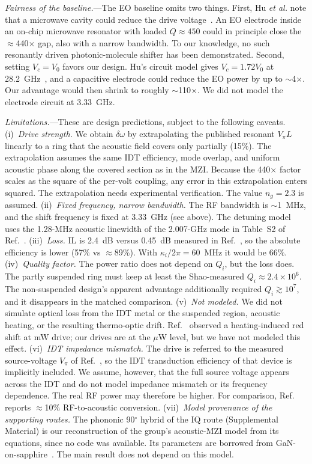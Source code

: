 \documentclass[aps,prl,reprint,superscriptaddress,amsmath,amssymb,floatfix]{revtex4-2}
\begin{document}
\emph{Fairness of the baseline.}---The EO baseline omits two things. First, Hu \emph{et al.} note that a microwave cavity could reduce the drive voltage~\cite{Hu2021}. An EO electrode inside an on-chip microwave resonator with loaded $Q\approx450$ could in principle close the $\approx$440$\times$ gap, also with a narrow bandwidth. To our knowledge, no such resonantly driven photonic-molecule shifter has been demonstrated. Second, setting $V_c=V_0$ favors our design. Hu's circuit model gives $V_c=1.72V_0$ at 28.2~GHz~\cite{Hu2021}, and a capacitive electrode could reduce the EO power by up to $\sim$4$\times$. Our advantage would then shrink to roughly $\sim$110$\times$. We did not model the electrode circuit at 3.33~GHz.

\emph{Limitations.}---These are design predictions, subject to the following caveats.
(i)~\emph{Drive strength.} We obtain $\delta\omega$ by extrapolating the published resonant $V_\pi L$~\cite{Shao2019} linearly to a ring that the acoustic field covers only partially (15\%). The extrapolation assumes the same IDT efficiency, mode overlap, and uniform acoustic phase along the covered section as in the MZI. Because the 440$\times$ factor scales as the square of the per-volt coupling, any error in this extrapolation enters squared. The extrapolation needs experimental verification. The value $n_g=2.3$ is assumed.
(ii)~\emph{Fixed frequency, narrow bandwidth.} The RF bandwidth is $\sim$1~MHz, and the shift frequency is fixed at 3.33~GHz (see above). The detuning model uses the 1.28-MHz acoustic linewidth of the 2.007-GHz mode in Table~S2 of Ref.~\cite{Shao2019}.
(iii)~\emph{Loss.} IL is 2.4~dB versus 0.45~dB measured in Ref.~\cite{Hu2021}, so the absolute efficiency is lower (57\% vs $\approx$89\%). With $\kappa_i/2\pi=60$~MHz it would be 66\%.
(iv)~\emph{Quality factor.} The power ratio does not depend on $Q_i$, but the loss does. The partly suspended ring must keep at least the Shao-measured $Q_i\approx2.4\times10^6$. The non-suspended design's apparent advantage additionally required $Q_i\gtrsim10^7$, and it disappears in the matched comparison.
(v)~\emph{Not modeled.} We did not simulate optical loss from the IDT metal or the suspended region, acoustic heating, or the resulting thermo-optic drift. Ref.~\cite{Shao2019} observed a heating-induced red shift at mW drive; our drives are at the $\mu$W level, but we have not modeled this effect.
(vi)~\emph{IDT impedance mismatch.} The drive is referred to the measured source-voltage $V_\pi$ of Ref.~\cite{Shao2019}, so the IDT transduction efficiency of that device is implicitly included. We assume, however, that the full source voltage appears across the IDT and do not model impedance mismatch or its frequency dependence. The real RF power may therefore be higher. For comparison, Ref.~\cite{Xu2025b} reports $\approx$10\% RF-to-acoustic conversion.
(vii)~\emph{Model provenance of the supporting routes.} The phononic 90$^\circ$ hybrid of the IQ route (Supplemental Material) is our reconstruction of the group's acoustic-MZI model from its equations, since no code was available. Its parameters are borrowed from GaN-on-sapphire~\cite{Xu2025}. The main result does not depend on this model.
\end{document}
